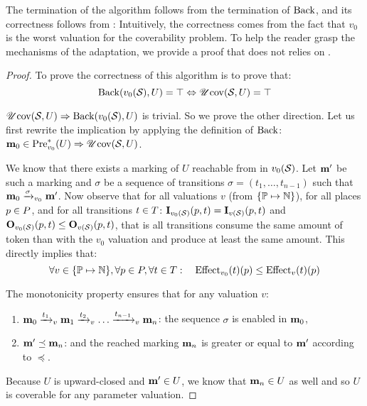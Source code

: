 The termination of the algorithm follows from the termination of $\back$, and its correctness follows from :
Intuitively, the correctness comes from the fact that $v_0$ is the worst valuation for the coverability problem.
To help the reader grasp the mechanisms of the adaptation, we provide a proof that does not relies on .
\begin{proof}
  To prove the correctness of this algorithm is to prove that:
  \[
    \back(v_0(\namePPN), U) = \top \Leftrightarrow \UcovOp(\namePPN, U) = \top
  \]

$\UcovOp(\namePPN, U) \Rightarrow \back(v_0(\namePPN), U)$ is trivial. So we prove the other direction. Let us first rewrite the implication by applying the definition of $\back$: $\mari \in \Pre_{v_0}^*(U) \Rightarrow \UcovOp(\namePPN, U)$.


  We know that there exists a marking of $U$ reachable from \mari in $v_0(\namePPN)$.
  Let $\marp$ be such a marking and $\sigma$ be a sequence of transitions $\sigma = (t_1, \dots, t_{n-1})$ such that $\mari \fire[{v_0}]{\sigma} \marp$.
  Now observe that for all valuations $v$ (from $\{\parameters \mapsto \naturals\}$), for all places $p \in \places$, and for all transitions $t \in \transitions$: $\matI_{v_0(\namePPN)}(p,t) = \matI_{v(\namePPN)}(p,t)$ and $\matO_{v_0(\namePPN)}(p,t) \leq \matO_{v(\namePPN)}(p,t)$, that is all transitions consume the same amount of token than with the $v_0$ valuation and produce at least the same amount. This directly implies that: 
  \[
    \forall v \in \{\parameters \mapsto \naturals\}, \forall p \in \places, \forall t \in \transitions :
  \quad
  \Effect_{v_0}(t)(p) \leq \Effect_v(t)(p)
  \]

The monotonicity property ensures that for any valuation $v$:
  \begin{enumerate}
    \item $\mari \fire[v]{t_1} \mar_1 \fire[v]{t_2} \dots \fire[v]{t_{n-1}} \mar_n$: the sequence $\sigma$ is enabled  in $\mari$,
    \item $\marp \preceq \mar_n$: and the reached marking $\mar_n$ is greater or equal to $\marp$ according to $\preceq$.
  \end{enumerate}

  Because $U$ is upward-closed and $\marp \in U$, we know that $\mar_n \in U$ as well and so $U$ is coverable for any parameter valuation.
\end{proof}

